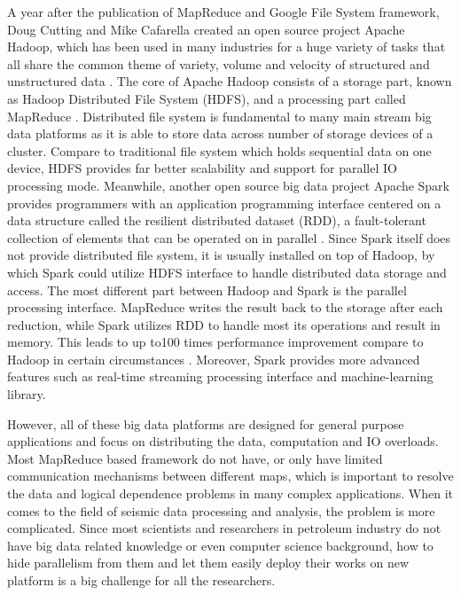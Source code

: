 A year after the publication of MapReduce and Google File System framework, Doug Cutting and Mike Cafarella created an open source project Apache Hadoop, which has been used in many industries for a huge variety of tasks that all share the common theme of variety, volume and velocity of structured and unstructured data \cite{bigdatahistory}. The core of Apache Hadoop consists of a storage part, known as Hadoop Distributed File System (HDFS), and a processing part called MapReduce \cite{ApacheHadoop}.  Distributed file system is fundamental to many main stream big data platforms as it is able to store data across number of storage devices of a cluster. Compare to traditional file system which holds sequential data on one device, HDFS provides far better scalability and support for parallel IO processing mode. Meanwhile, another open source big data project Apache Spark provides programmers with an application programming interface centered on a data structure called the resilient distributed dataset (RDD), a fault-tolerant collection of elements that can be operated on in parallel \cite{ApacheSpark}. Since Spark itself does not provide distributed file system, it is usually installed on top of Hadoop, by which Spark could utilize HDFS interface to handle distributed data storage and access. The most different part between Hadoop and Spark is the parallel processing interface. MapReduce writes the result back to the storage after each reduction, while Spark utilizes RDD to handle most its operations and result in memory. This leads to up to100 times performance improvement compare to Hadoop in certain circumstances \cite{ApacheSpark}. Moreover, Spark provides more advanced features such as real-time streaming processing interface and machine-learning library.

However, all of these big data platforms are designed for general purpose applications and focus on distributing the data, computation and IO overloads. Most MapReduce based framework do not have, or only have limited communication mechanisms between different maps, which is important to resolve the data and logical dependence problems in many complex applications. When it comes to the field of  seismic data processing and analysis, the problem is more complicated. Since most scientists and researchers in petroleum industry do not have big data related knowledge or even computer science background, how to hide parallelism from them and let them easily deploy their works on new platform is a big challenge for all the researchers.


